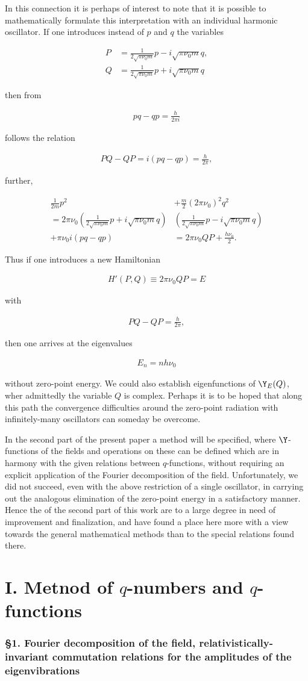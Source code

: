 \documentclass{article}
\newcommand{\uequ}[1]{
\begin{align*}
#1
\end{align*}
}
\begin{document}
In this connection it is perhaps of interest to note that it is possible to mathematically formulate this interpretation with an individual harmonic oscillator. If one introduces instead of $p$ and $q$ the variables
\uequ{
P&=\frac{1}{2\sqrt{\pi\nu_0 m}}p - i\sqrt{\pi\nu_0 m}q,\\
Q&=\frac{1}{2\sqrt{\pi\nu_0 m}}p + i\sqrt{\pi\nu_0 m}q
}
then from
\uequ{
pq - qp = \frac{h}{2\pi i}
}
follows the relation
\uequ{
PQ-QP = i(pq-qp) = \frac{h}{2\pi},
}
further,
\uequ{
\frac{1}{2m}p^2 &+ \frac{m}{2}(2\pi \nu_0)^2 q^2\\
= 2\pi\nu_0\left(\frac{1}{2\sqrt{\pi\nu_0 m}}p + i\sqrt{\pi\nu_0 m}q\right)&
\left(\frac{1}{2\sqrt{\pi\nu_0 m}}p - i\sqrt{\pi\nu_0 m}q\right)\\
+ \pi\nu_0 i(pq-qp) &= 2\pi\nu_0 QP + \frac{h\nu_0}{2}.
}

Thus if one introduces a new Hamiltonian
\uequ{
H'(P,Q) \equiv 2\pi\nu_0 QP = E
}
with
\uequ{
PQ-QP=\frac{h}{2\pi},
}
then one arrives at the eigenvalues
\uequ{
E_n = nh\nu_0
}
without zero-point energy. We could also establish eigenfunctions of $\Y_E(Q)$, wher admittedly the variable $Q$ is complex. Perhaps it is to be hoped that along this path the convergence difficulties around the zero-point radiation with infinitely-many oscillators can someday be overcome.

In the second part of the present paper a method will be specified, where $\Y$-functions of the fields and operations on these can be defined which are in harmony with the given relations between $q$-functions, without requiring an explicit application of the Fourier decomposition of the field. Unfortunately, we did not succeed, even with the above restriction of a single oscillator, in carrying out the analogous elimination of the zero-point energy in a satisfactory manner. Hence the of the second part of this work are to a large degree in need of improvement and finalization, and have found a place here more with a view towards the general mathematical methods than to the special relations found there.

\part*{I. Metnod of $q$-numbers and $q$-functions}

\section*{§1. Fourier decomposition of the field, relativistically-invariant commutation relations for the amplitudes of the eigenvibrations}
\end{document}
